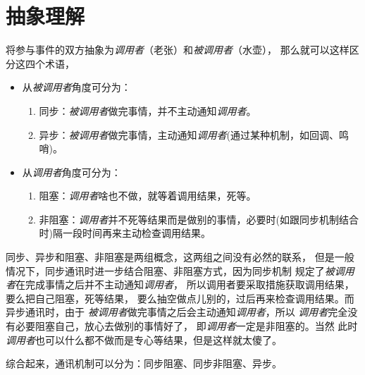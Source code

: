 \documentclass[a4paper,11pt]{article}
\begin{document}
\section[抽象理解]{抽象理解}
将参与事件的双方抽象为\emph{调用者}（老张）和\emph{被调用者}（水壶），
那么就可以这样区分这四个术语，
\begin{itemize}
  \item 从\emph{被调用者}角度可分为：
    \begin{enumerate}
      \item 同步：\emph{被调用者}做完事情，并不主动通知\emph{调用者}。
      \item 异步：\emph{被调用者}做完事情，主动通知\emph{调用者}(通过某种机制，如回调、鸣哨)。
    \end{enumerate}
  \item 从\emph{调用者}角度可分为：
    \begin{enumerate}
      \item 阻塞：\emph{调用者}啥也不做，就等着调用结果，死等。
      \item 非阻塞：\emph{调用者}并不死等结果而是做别的事情，必要时(如跟同步机制结合时)隔一段时间再来主动检查调用结果。
    \end{enumerate}
\end{itemize}
同步、异步和阻塞、非阻塞是两组概念，这两组之间没有必然的联系，
但是一般情况下，同步通讯时进一步结合阻塞、非阻塞方式，因为同步机制
规定了\emph{被调用者}在完成事情之后并不主动通知\emph{调用者}，
所以调用者要采取措施获取调用结果，要么把自己阻塞，死等结果，
要么抽空做点儿别的，过后再来检查调用结果。而异步通讯时，由于
\emph{被调用者}做完事情之后会主动通知\emph{调用者}，所以
\emph{调用者}完全没有必要阻塞自己，放心去做别的事情好了，
即\emph{调用者}一定是非阻塞的。当然
此时\emph{调用者}也可以什么都不做而是专心等结果，但是这样就太傻了。

综合起来，通讯机制可以分为：同步阻塞、同步非阻塞、异步。
\end{document}
